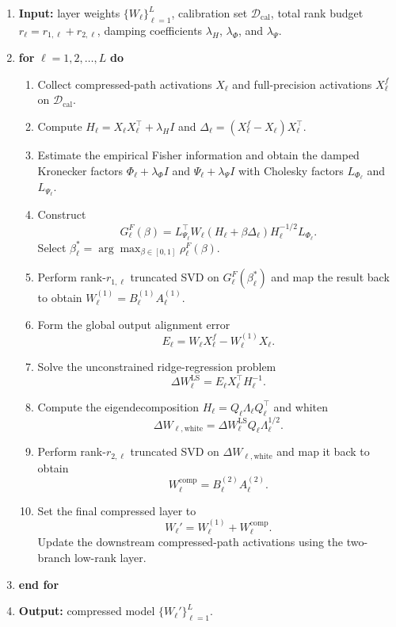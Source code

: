 \documentclass[a4paper,fleqn]{cas-dc}
\begin{document}
\begin{algorithm}[t]
\caption{FR-SVD for layer-wise low-rank compression of LLMs}
\label{alg:frsvd}
\small
\begin{enumerate}[leftmargin=1.5em]
    \item \textbf{Input:} layer weights $\{W_\ell\}_{\ell=1}^{L}$, calibration set $\mathcal{D}_{\mathrm{cal}}$, total rank budget $r_\ell=r_{1,\ell}+r_{2,\ell}$, damping coefficients $\lambda_H$, $\lambda_\Phi$, and $\lambda_\Psi$.
    \item \textbf{for} $\ell = 1,2,\dots,L$ \textbf{do}
    \begin{enumerate}[leftmargin=1.5em,label* = \arabic*.]
        \item Collect compressed-path activations $X_\ell$ and full-precision activations $X_\ell^f$ on $\mathcal{D}_{\mathrm{cal}}$.
        \item Compute $H_\ell = X_\ell X_\ell^{\top} + \lambda_H I$ and $\Delta_\ell = (X_\ell^f - X_\ell)X_\ell^{\top}$.
        \item Estimate the empirical Fisher information and obtain the damped Kronecker factors $\Phi_\ell + \lambda_\Phi I$ and $\Psi_\ell + \lambda_\Psi I$ with Cholesky factors $L_{\Phi_\ell}$ and $L_{\Psi_\ell}$.
        \item Construct
        \[
        G_\ell^F(\beta) = L_{\Psi_\ell}^{\top} W_\ell (H_\ell + \beta \Delta_\ell) H_\ell^{-1/2} L_{\Phi_\ell}.
        \]
        Select $\beta_\ell^* = \arg\max_{\beta\in[0,1]} \rho_\ell^F(\beta)$.
        \item Perform rank-$r_{1,\ell}$ truncated SVD on $G_\ell^F(\beta_\ell^*)$ and map the result back to obtain $W_\ell^{(1)} = B_\ell^{(1)}A_\ell^{(1)}$.
        \item Form the global output alignment error
        \[
        E_\ell = W_\ell X_\ell^f - W_\ell^{(1)}X_\ell.
        \]
        \item Solve the unconstrained ridge-regression problem
        \[
        \Delta W_{\ell}^{\mathrm{LS}} = E_\ell X_\ell^{\top} H_\ell^{-1}.
        \]
        \item Compute the eigendecomposition $H_\ell = Q_\ell \Lambda_\ell Q_\ell^{\top}$ and whiten
        \[
        \Delta W_{\ell,\mathrm{white}} = \Delta W_{\ell}^{\mathrm{LS}} Q_\ell \Lambda_\ell^{1/2}.
        \]
        \item Perform rank-$r_{2,\ell}$ truncated SVD on $\Delta W_{\ell,\mathrm{white}}$ and map it back to obtain
        \[
        W_\ell^{\mathrm{comp}} = B_\ell^{(2)}A_\ell^{(2)}.
        \]
        \item Set the final compressed layer to
        \[
        W_\ell' = W_\ell^{(1)} + W_\ell^{\mathrm{comp}}.
        \]
        Update the downstream compressed-path activations using the two-branch low-rank layer.
    \end{enumerate}
    \item \textbf{end for}
    \item \textbf{Output:} compressed model $\{W_\ell'\}_{\ell=1}^{L}$.
\end{enumerate}
\end{algorithm}
\end{document}
